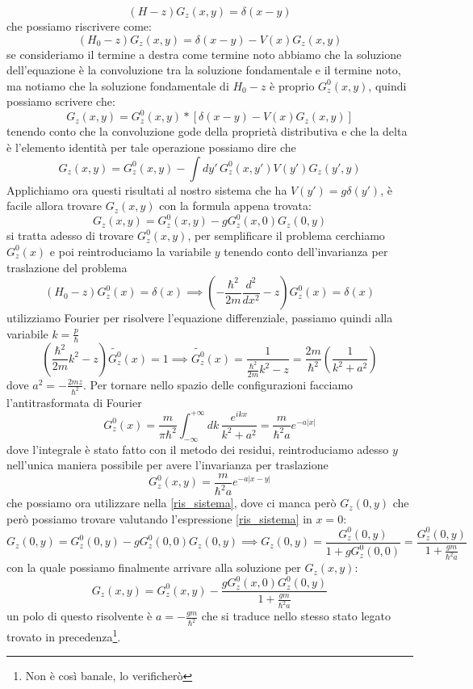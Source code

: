 \[(H-z)G_z(x,y) = \delta(x-y)\]
che possiamo riscrivere come:
\[(H_0-z)G_z(x,y) = \delta(x-y) - V(x)G_z(x,y)\]
se consideriamo il termine a destra come termine noto abbiamo che la soluzione dell'equazione è la convoluzione tra la soluzione fondamentale e il termine noto, ma notiamo che la soluzione fondamentale di $H_0-z$ è proprio $G_z^0(x,y)$, quindi possiamo scrivere che:
\[G_z(x,y) = G_z^0(x,y)*[\delta(x-y) - V(x)G_z(x,y)] \]
tenendo conto che la convoluzione gode della proprietà distributiva e che la delta è l'elemento identità per tale operazione possiamo dire che
\begin{equation}\label{ris_nucleo}G_z(x,y) = G_z^0(x,y) - \int dy'\, G_z^0(x,y')V(y')G_z(y',y)\end{equation}
Applichiamo ora questi risultati al nostro sistema che ha $V(y') = g\delta(y')$, è facile allora trovare $G_z(x,y)$ con la formula appena trovata:
\begin{equation}\label{ris_sistema}G_z(x,y) = G_z^0(x,y) -gG_z^0(x,0)G_z(0,y)\end{equation}
si tratta adesso di trovare $G_z^0(x,y)$, per semplificare il problema cerchiamo $G_z^0(x)$ e poi reintroduciamo la variabile $y$ tenendo conto dell'invarianza per traslazione del problema
\[(H_0 -z)G_z^0(x) = \delta(x) \implies \left(-\frac{\hbar^2}{2m}\frac{d^2}{dx^2}-z\right)G_z^0(x) = \delta(x)\]
utilizziamo Fourier per risolvere l'equazione differenziale, passiamo quindi alla variabile $k = \frac{p}{\hbar}$
\[\left(\frac{\hbar^2}{2m}k^2 -z\right)\widetilde{G_z^0}(x) = 1 \implies \widetilde{G_z^0}(x) = \frac{1}{\frac{\hbar^2}{2m}k^2-z} = \frac{2m}{\hbar^2}\left(\frac{1}{k^2+a^2}\right) \] 
dove $a^2 = -\frac{2mz}{\hbar^2}$. Per tornare nello spazio delle configurazioni facciamo l'antitrasformata di Fourier
\[G_z^0(x) = \frac{m}{\pi\hbar^2}\int_{-\infty}^{+\infty}dk\, \frac{e^{ikx}}{k^2+a^2} = \frac{m}{\hbar^2a}e^{-a|x|}\]
dove l'integrale è stato fatto con il metodo dei residui, reintroduciamo adesso $y$ nell'unica maniera possibile per avere l'invarianza per traslazione
\[G_z^0(x,y)  = \frac{m}{\hbar^2a}e^{-a|x-y|}\]
che possiamo ora utilizzare nella \eqref{ris_sistema}, dove ci manca però $G_z(0,y)$ che però possiamo trovare valutando l'espressione \eqref{ris_sistema} in $x=0$:
\[G_z(0,y) = G_z^0(0,y) - gG_z^0(0,0)G_z(0,y) \implies G_z(0,y) = \frac{G_z^0(0,y)}{1+ gG_z^0(0,0)} = \frac{G_z^0(0,y)}{1+ \frac{gm}{\hbar^2a}}\]
con la quale possiamo finalmente arrivare alla soluzione per $G_z(x,y)$:
\[G_z(x,y) = G_z^0(x,y) - \frac{gG_z^0(x,0)G_z^0(0,y)}{1+ \frac{gm}{\hbar^2a}}\]
un polo di questo risolvente è $a = -\frac{gm}{\hbar^2}$ che si traduce nello stesso stato legato trovato in precedenza\footnote{Non è così banale, lo verificherò}.\\ 
